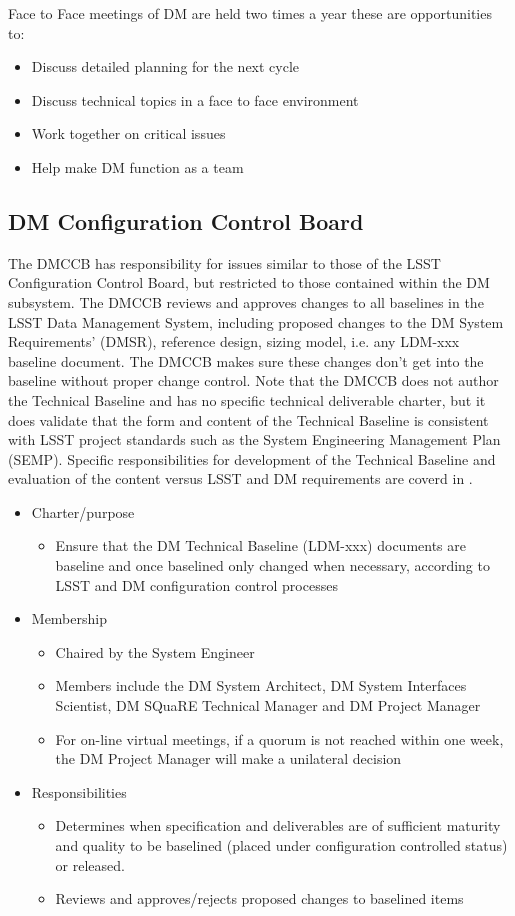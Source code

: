 Face to Face meetings of DM are held two times a year these are opportunities to:
\begin{itemize}
\item Discuss detailed planning for the next cycle
\item Discuss technical topics in a face to face environment
\item Work together on critical issues
\item Help make DM function as a team
\end{itemize}


\subsection{DM Configuration Control Board \label{sect:tct}}
The DMCCB has responsibility for issues similar to those of the LSST Configuration Control Board, but restricted to those contained within the DM subsystem. The DMCCB reviews and approves changes to all baselines in the LSST Data Management System, including proposed changes to the DM System Requirements' (DMSR), reference design, sizing model, i.e. any LDM-xxx baseline document.  The DMCCB makes sure these changes don't get into the baseline without proper change control.  Note that the DMCCB does not author the Technical Baseline and has no specific technical deliverable charter, but it does validate that the form and content of the Technical Baseline is consistent with LSST project standards such as the System Engineering Management Plan (SEMP).  Specific responsibilities for development of the Technical Baseline and evaluation of the content versus LSST and DM requirements are coverd in .
\begin{itemize}
\item Charter/purpose
	\begin{itemize}
	\item Ensure that the DM Technical Baseline (LDM-xxx) documents are baseline and once baselined only changed when necessary, according to LSST and DM configuration control processes
	\end{itemize}
\item Membership
	\begin{itemize}
	\item Chaired by the System Engineer
	\item Members include the DM System Architect, DM System Interfaces Scientist, DM SQuaRE Technical Manager and DM Project Manager
	\item For on-line virtual meetings, if a quorum is not reached within one week, the DM Project Manager will make a unilateral decision
	\end{itemize}
\item Responsibilities
	\begin{itemize}
	\item Determines when specification and deliverables are of sufficient maturity and quality to be baselined (placed under configuration controlled status) or released. 
	\item Reviews and approves/rejects proposed changes to baselined items
	\end{itemize}
\end{itemize}

